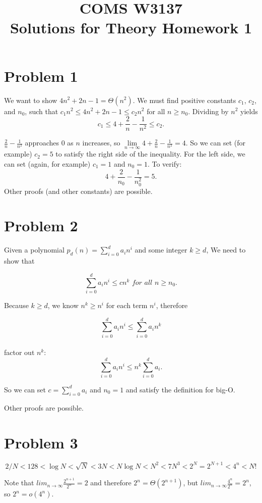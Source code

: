\documentclass{article}
\title{COMS W3137\\ Solutions for Theory Homework 1}
\begin{document}
\setlength{\parindent}{0in}
\maketitle


\section*{Problem 1}
We want to show $4 n^2 + 2n - 1 = \Theta(n^2)$. We must find positive constants $c_1$, $c_2$, and $n_0$, such that 
$c_1 n^2 \leq 4 n^2 +2n - 1 \leq c_2 n^2$ for all $n \geq n_0$. Dividing by $n^2$ yields
$$c_1 \leq 4 + \frac{2}{n} - \frac{1}{n^2} \leq c_2.$$

$ \frac{2}{n} - \frac{1}{n^2}$ approaches 0 as $n$ increases, so $\lim\limits_{n \rightarrow \infty} 4 + \frac{2}{n} - \frac{1}{n^2} = 4$. So we can set (for example) $c_2 = 5$ to satisfy the right side of the inequality. For the left side, we can set (again, for example) $c_1 = 1$ and $n_0 = 1$. To verify: 
$$4 + \frac{2}{n_0} - \frac{1}{n_0^2} = 5.$$
Other proofs (and other constants) are possible. 

\section*{Problem 2}

Given a polynomial $p_d(n) = \sum_{i=0}^{d} a_i n^i$
 and some integer $k  \geq d$, We need to show that 

$$\sum_{i=0}^{d} a_i n^i \leq c n^k  \textit{ for all } n\geq n_0.$$

Because $k \geq d$, we know $n^k \geq n^i$ for each term $n^i$, therefore

$$\sum_{i=0}^{d} a_i n^i \leq  \sum_{i=0}^{d} a_i n^k$$\\ factor out $n^k$:
$$ \sum_{i=0}^d a_i n^i \leq  n^k \sum_{i=0}^d a_i.$$

So we can set $c =   \sum\limits_{i=0}^d a_i$ and $n_0=1$ and satisfy the definition for big-O.

Other proofs are possible.

\section*{Problem 3}
$$2/N <128 < \log N < \sqrt{N} < 3N <N \log N < N^2 < 7 N^3 < 2^N = 2^{N+1} < 4^n < N!$$

Note that $lim_{n\rightarrow \infty} \frac{2^{n+1}}{2^n} = 2$ and therefore $2^n  = \Theta(2^{n+1})$, but $lim_{n\rightarrow \infty} \frac{4^{n}}{2^n} = 2^n$, so $2^n = o(4^n)$.
\end{document}
